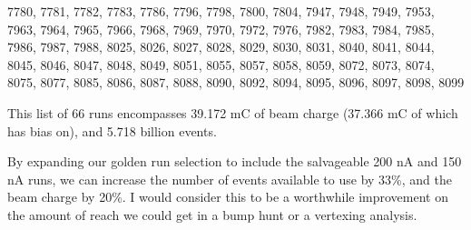 \documentclass[11pt]{article}
\begin{document}
7780, 7781, 7782, 7783, 7786, 7796, 7798, 7800, 7804, 7947, 7948, 7949, 7953, 7963, 7964, 7965, 7966, 7968, 7969, 7970, 7972, 7976, 7982, 7983, 7984, 7985, 7986, 7987, 7988, 8025, 8026, 8027, 8028, 8029, 8030, 8031, 8040, 8041, 8044, 8045, 8046, 8047, 8048, 8049, 8051, 8055, 8057, 8058, 8059, 8072, 8073, 8074, 8075, 8077, 8085, 8086, 8087, 8088, 8090, 8092, 8094, 8095, 8096, 8097, 8098, 8099

This list of 66 runs encompasses 39.172 mC of beam charge (37.366 mC of which has bias on), and 5.718 billion events.  

By expanding our golden run selection to include the salvageable 200 nA and 150 nA runs, we can increase the number of events available to use by 33\%, and the beam charge by 20\%.  I would consider this to be a worthwhile improvement on the amount of reach we could get in a bump hunt or a vertexing analysis.  


\end{document}
